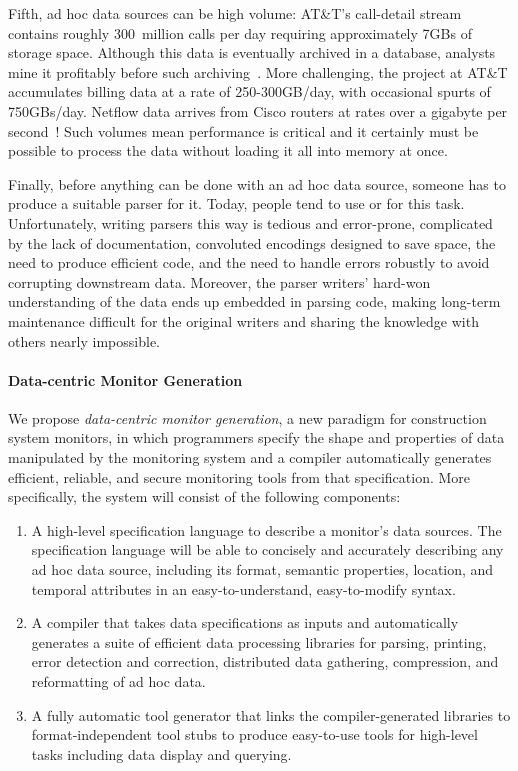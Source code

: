 Fifth, ad hoc data sources can be high volume:
AT\&T's call-detail stream contains roughly 300~million calls per day
requiring approximately 7GBs of storage space. Although this data is
eventually archived in a database, analysts mine it profitably before
such archiving~\cite{kdd98,kdd99}. More challenging, the \ningaui{}
project at AT\&T accumulates billing data at a rate of 250-300GB/day,
with occasional spurts of 750GBs/day. Netflow data arrives from Cisco
routers at rates over a gigabyte per second~\cite{gigascope}! Such
volumes mean performance is critical and it certainly
must be possible to process the data without loading
it all into memory at once.

Finally, before anything can be done with an ad hoc data source,
someone has to produce a suitable parser for it.  Today, people tend
to use \C{} or \perl{} for this task.  Unfortunately, writing parsers
this way is tedious and error-prone, complicated by the lack of
documentation, convoluted encodings designed to save space, the need
to produce efficient code, and the need to handle errors robustly to
avoid corrupting downstream data.  Moreover, the parser writers'
hard-won understanding of the data ends up embedded in parsing code,
making long-term maintenance difficult for the original writers and
sharing the knowledge with others nearly impossible.

\paragraph*{Data-centric Monitor Generation}
We propose {\em data-centric monitor generation}, a new paradigm
for construction system monitors, in which programmers
specify the shape and properties of data manipulated by
the monitoring system and a compiler automatically
generates efficient, reliable, and secure
monitoring tools from that specification.
More specifically, the system will consist of the 
following components:

\begin{enumerate}

\item A high-level specification language to describe a monitor's
data sources.  The specification language will be able to
concisely and accurately describing any ad hoc data source,
including its format, semantic properties, location, and
temporal attributes in an easy-to-understand, easy-to-modify syntax.

\item A compiler that takes data specifications as inputs and
automatically generates a suite of 
efficient data processing libraries for parsing, printing, error detection
and correction, distributed data gathering, compression, and 
reformatting of ad hoc data.

\item A fully automatic tool generator that links the compiler-generated 
libraries to format-independent tool stubs to produce easy-to-use 
tools for high-level tasks including data display and querying.

\end{enumerate}

